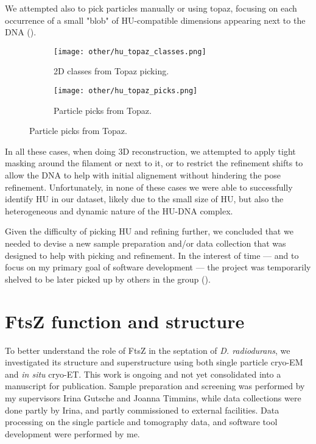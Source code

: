 We attempted also to pick particles manually or using topaz, focusing on each occurrence of a small "blob" of HU-compatible dimensions appearing next to the DNA ().

\begin{figure}
    \centering
    \begin{subfigure}[B]{.49\textwidth}
        \centering
        \texttt{[image: other/hu\_topaz\_classes.png]}
        \caption{2D classes from Topaz picking.}
        \label{fig:hu_topaz_classes}
    \end{subfigure}%
    \hfill
    \begin{subfigure}[B]{.49\textwidth}
        \centering
        \texttt{[image: other/hu\_topaz\_picks.png]}
        \caption{Particle picks from Topaz.}
        \label{fig:hu_topaz_picks}
    \end{subfigure}%
    \label{fig:hu_topaz}
\end{figure}

In all these cases, when doing 3D reconstruction, we attempted to apply tight masking around the filament or next to it, or to restrict the refinement shifts to allow the DNA to help with initial alignement without hindering the pose refinement.
Unfortunately, in none of these cases we were able to successfully identify HU in our dataset, likely due to the small size of HU, but also the heterogeneous and dynamic nature of the HU-DNA complex.

Given the difficulty of picking HU and refining further, we concluded that we needed to devise a new sample preparation and/or data collection that was designed to help with picking and refinement.
In the interest of time --- and to focus on my primary goal of software development --- the project was temporarily shelved to be later picked up by others in the group ().


\section{FtsZ function and structure}\label{ftsz}

To better understand the role of FtsZ in the septation of \textit{D. radiodurans}, we investigated its structure and superstructure using both single particle cryo-EM and \textit{in situ} cryo-ET.
This work is ongoing and not yet consolidated into a manuscript for publication.
Sample preparation and screening was performed by my supervisors Irina Gutsche and Joanna Timmins, while data collections were done partly by Irina, and partly commissioned to external facilities.
Data processing on the single particle and tomography data, and software tool development were performed by me.

